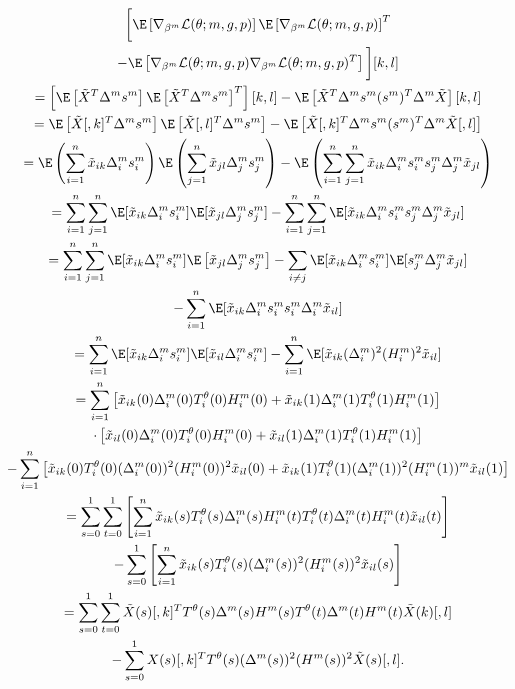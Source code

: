 \documentclass[12pt]{article}
\begin{document}
\begin{appendices}
\begin{multline*}
\bigg[ \E \left[ \nabla_{\beta^m} \mathcal{L}(\theta; m, g, p) \right] \E \left[ \nabla_{\beta^m} \mathcal{L}(\theta; m, g, p) \right]^T \\ - \E \left[\nabla_{\beta^m} \mathcal{L}(\theta; m, g, p) \nabla_{\beta^m} \mathcal{L}(\theta; m, g, p)^T \right] \bigg] [k,l] \\ 
= \left[ \E \left[\tilde{X}^T \Delta^m s^m \right] \E \left[\tilde{X}^T \Delta^m s^m \right]^T\right][k,l] - \E \left[\tilde{X}^T \Delta^m s^m (s^m)^T \Delta^m \tilde{X} \right][k,l] \\
= \E\left[ \tilde{X}[,k]^T \Delta^m s^m \right] \E \left[ \tilde{X}[,l]^T \Delta^m s^m \right] - \E \left[ \tilde{X}[,k]^T \Delta^m s^m (s^m)^T \Delta^m \tilde{X}[,l ] \right] \\ 
=\E\left(\sum_{i=1}^n \tilde{x}_{ik} \Delta^m_i s^m_{i} \right) \E \left( \sum_{j=1}^n \tilde{x}_{jl} \Delta^m_j s^m_j \right) - \E \left( \sum_{i=1}^n \sum_{j=1}^n \tilde{x}_{ik} \Delta^m_i s^m_i s^m_j \Delta^m_j \tilde{x}_{jl} \right) \\
= \sum_{i=1}^n \sum_{j=1}^n \E[ \tilde{x}_{ik} \Delta^m_is^m_i] \E [\tilde{x}_{jl} \Delta^m_j s^m_j]  -  \sum_{i=1}^n \sum_{j=1}^n \E [ \tilde{x}_{ik} \Delta^m_i s^m_i s^m_j \Delta^m_j \tilde{x}_{jl}] \\
= \sum_{i=1}^n \sum_{j=1}^n \E[ \tilde{x}_{ik} \Delta^m_i s^m_i] \E \left[\tilde{x}_{jl} \Delta^m_j s^m_j \right]  - \sum_{i \neq j} \E [ \tilde{x}_{ik} \Delta^m_i s^m_i] \E[s^m_j \Delta^m_j \tilde{x}_{jl}] \\ - \sum_{i=1}^n \E[\tilde{x}_{ik} \Delta^m_i s^m_i s^m_i \Delta^m_i \tilde{x}_{il}] \\ 
= \sum_{i=1}^n \E[\tilde{x}_{ik} \Delta^m_i s^m_i ] \E [ \tilde{x}_{il} \Delta^m_i s^m_i] - \sum_{i=1}^n \E[\tilde{x}_{ik} (\Delta_i^m)^2 (H_i^m)^2 \tilde{x}_{il}] \\ = \sum_{i=1}^n \left[\tilde{x}_{ik}(0) {\Delta}^m_i(0) T_i^{\theta}(0) {H}^m_i(0) + \tilde{x}_{ik}(1) {\Delta}^m_i(1) T_i^{\theta}(1) {H}^m_i(1) \right] \\ \cdot \left[ \tilde{x}_{il}(0) {\Delta}^m_i(0) T_i^{\theta}(0) {H}^m_i(0) + \tilde{x}_{il}(1) {\Delta}^m_i(1) T_i^{\theta}(1) {H}^m_i(1) \right] \\ - \sum_{i=1}^n \left[ \tilde{x}_{ik}(0) T_i^{\theta}(0) (\Delta_i^m(0))^2 ({H}_i^m(0))^2 \tilde{x}_{il}(0)  + \tilde{x}_{ik}(1) T_i^{\theta}(1) ({\Delta}^m_i(1))^2 ({H}_i^m(1))^m \tilde{x}_{il}(1) \right] \\ = \sum_{s=0}^1 \sum_{t=0}^1 \left[ \sum_{i=1}^n \tilde{x}_{ik}(s) T^{\theta}_i(s) {\Delta}^m_i(s) {H}^m_i(t) T_i^{\theta}(t){\Delta}^m_i(t) {H}^m_i(t) \tilde{x}_{il}(t) \right] \\ - \sum_{s=0}^1 \left[\sum_{i=1}^n \tilde{x}_{ik}(s) T_i^\theta(s) ({\Delta}^m_i(s))^2 ({H}_i^m(s))^2 \tilde{x}_{il}(s) \right] \\ = \sum_{s=0}^1 \sum_{t=0}^1 \tilde{X}(s)[,k]^T {T}^\theta(s) {\Delta}^m(s) {H}^m(s) {T}^\theta(t) {\Delta}^m(t) {H}^m(t) \tilde{X}(k)[,l] \\ - \sum_{s=0}^1{X}(s)[,k]^T {T}^\theta(s) ({\Delta}^m(s))^2 ({H}^m(s))^2 \tilde{X}(s)[,l].

\end{multline*}
\end{appendices}
\end{document}
